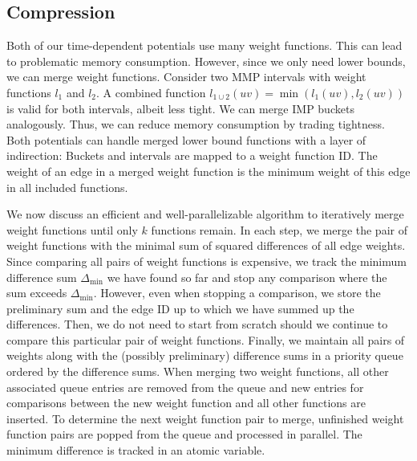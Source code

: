 \documentclass[a4paper,UKenglish,cleveref, autoref, thm-restate,anonymous]{lipics-v2021}
\begin{document}
\subsection{Compression}\label{sec:compression}

Both of our time-dependent potentials use many weight functions.
This can lead to problematic memory consumption.
However, since we only need lower bounds, we can merge weight functions.
Consider two MMP intervals with weight functions $l_1$ and $l_2$.
A combined function $l_{1 \cup 2}(uv) = \min(l_1(uv), l_2(uv))$ is valid for both intervals, albeit less tight.
We can merge IMP buckets analogously.
Thus, we can reduce memory consumption by trading tightness.
Both potentials can handle merged lower bound functions with a layer of indirection:
Buckets and intervals are mapped to a weight function ID.
The weight of an edge in a merged weight function is the minimum weight of this edge in all included functions.

We now discuss an efficient and well-parallelizable algorithm to iteratively merge weight functions until only $k$ functions remain.
In each step, we merge the pair of weight functions with the minimal sum of squared differences of all edge weights.
Since comparing all pairs of weight functions is expensive, we track the minimum difference sum $\Delta_{\min}$ we have found so far and stop any comparison where the sum exceeds $\Delta_{\min}$.
However, even when stopping a comparison, we store the preliminary sum and the edge ID up to which we have summed up the differences.
Then, we do not need to start from scratch should we continue to compare this particular pair of weight functions.
Finally, we maintain all pairs of weights along with the (possibly preliminary) difference sums in a priority queue ordered by the difference sums.
When merging two weight functions, all other associated queue entries are removed from the queue and new entries for comparisons between the new weight function and all other functions are inserted.
To determine the next weight function pair to merge, unfinished weight function pairs are popped from the queue and processed in parallel.
The minimum difference is tracked in an atomic variable.
\end{document}
